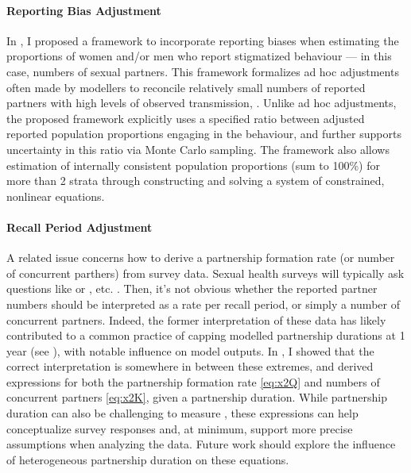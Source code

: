 \paragraph{Reporting Bias Adjustment}
In , I proposed a framework to incorporate reporting biases
when estimating the proportions of women and/or men who report stigmatized behaviour
--- in this case, numbers of sexual partners.
This framework formalizes ad hoc adjustments often made by modellers
to reconcile relatively small numbers of reported partners
with high levels of observed transmission, \eg \cite{Anderson2014}.
Unlike ad hoc adjustments, the proposed framework explicitly uses
a specified ratio between adjusted \vs reported population proportions engaging in the behaviour,
and further supports uncertainty in this ratio via Monte Carlo sampling.
The framework also allows estimation of
internally consistent population proportions (\ie sum to 100\%) for more than 2 strata
through constructing and solving a system of constrained, nonlinear equations.
\paragraph{Recall Period Adjustment}
A related issue concerns how to derive a partnership formation rate
(or number of concurrent parthers) from survey data.
Sexual health surveys will typically ask questions like
 \cite{DHS}
or , etc. \cite{Baral2014,EswKP2014,EswBSS2002}.
Then, it's not obvious whether the reported partner numbers should be interpreted as
a rate per recall period, or simply a number of concurrent partners.
Indeed, the former interpretation of these data has likely contributed to
a common practice of capping modelled partnership durations at 1 year (see ),
with notable influence on model outputs.
In , I showed that the correct interpretation
is somewhere in between these extremes,
and derived expressions for both
the partnership formation rate \eqref{eq:x2Q}
and numbers of concurrent partners \eqref{eq:x2K}, given a partnership duration.
While partnership duration can also be challenging to measure \cite{Burington2010},
these expressions can help conceptualize survey responses and,
at minimum, support more precise assumptions when analyzing the data.
Future work should explore the influence of heterogeneous partnership duration on these equations.
